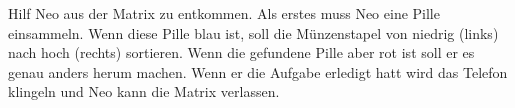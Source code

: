 Hilf Neo aus der Matrix zu entkommen. Als erstes muss Neo eine Pille einsammeln. Wenn diese Pille blau ist, soll die Münzenstapel von niedrig (links) nach hoch (rechts) sortieren. Wenn die gefundene Pille aber rot ist soll er es genau anders herum machen.
Wenn er die Aufgabe erledigt hatt wird das Telefon klingeln und Neo kann die Matrix verlassen.
